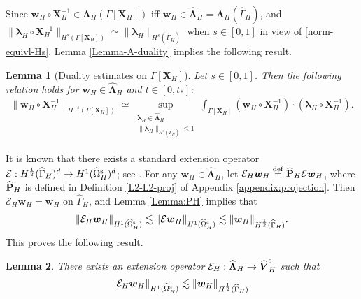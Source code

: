 \documentclass[11pt,reqno]{amsart}
\theoremstyle{definition}
\theoremstyle{plain}
\newtheorem{lemma}{Lemma}[section]
\numberwithin{theorem}{section}
\numberwithin{proposition}{section}
\numberwithin{lemma}{section}
\numberwithin{equation}{section}
\newcommand{\bs}[1]{\boldsymbol{#1}}
\renewcommand{\(}{\bigl(}
\renewcommand{\)}{\bigr)}
\def\eqd{\stackrel{\mathrm{def}}{=}}
\begin{document}
Since ${\bs w}_H\circ{\bs X}_H^{-1}\in {\bs\Lambda}_H(\Gamma[{\bs X}_H])$ iff ${\bs w}_H\in \widehat{\bs\Lambda}_H = {\bs\Lambda}_H(\widehat\Gamma_H)$, and $\|{\bs\lambda}_H\circ{\bs X}_H^{-1}\|_{H^s(\Gamma[{\bs X}_H])} \simeq \|{\bs\lambda}_H\|_{H^s(\widehat\Gamma_H )}$ when $s\in[0,1]$ in view of \eqref{norm-equivl-Hs}, Lemma \ref{Lemma-A-duality} implies the following result. 

\begin{lemma}[Duality estimates on {$\Gamma[{\bs X}_H]$}]\label{Lemma-A-duality0}
Let $s\in[0,1]$. Then the following relation holds for ${\bs w}_H\in \widehat{\bs\Lambda}_H $ and $t\in[0,t_*]$: 
\begin{align*}
\|{\bs w}_H\circ{\bs X}_H^{-1}\|_{H^{-s}(\Gamma[{\bs X}_H])}
\simeq
\sup_{\substack{{\bs\lambda}_H\in \widehat{\bs\Lambda}_H\\ \|{\bs\lambda}_H\|_{H^{s}(\widehat\Gamma_H)}\le 1}} \int_{\Gamma[{\bs X}_H]} ({\bs w}_H\circ{\bs X}_H^{-1}) \cdot ({\bs\lambda}_H\circ{\bs X}_H^{-1} ) .
\end{align*}
\end{lemma}

It is known that there exists a standard extension operator $\mathcal{E}:H^{\frac12}(\widehat\Gamma_H)^d\rightarrow H^1(\widehat\Omega^{\rm s}_H)^d$; see \cite[Theorem 1.5.1.3]{Grisvard-2011}. 
For any ${\bs w}_H\in \widehat{\bs\Lambda}_H$, let $\mathcal{E}_H{\bs w}_H\eqd \widehat{\bf P}_H\mathcal{E}{\bs w}_H$, where $\widehat{\bf P}_H$ is defined in Definition \ref{L2-L2-proj} of Appendix \ref{appendix:projection}. Then $\mathcal{E}_H{\bs w}_H={\bs w}_H$ on $\widehat\Gamma_H$, and Lemma \ref{Lemma:PH} implies that 
$$
\|\mathcal{E}_H{\bs w}_H\|_{H^1(\widehat\Omega^{\rm s}_H)}
\lesssim \|\mathcal{E}{\bs w}_H\|_{H^1(\widehat\Omega^{\rm s}_H)}
\lesssim \|{\bs w}_H\|_{H^{\frac12}(\widehat\Gamma_H)} . 
$$
This proves the following result.
\begin{lemma}\label{Lemma:extension}
There exists an extension operator $\mathcal{E}_H: \widehat{\bs\Lambda}_H \rightarrow \widehat{\bs V}^{\rm s}_H $ such that 
\begin{align*}
\|\mathcal{E}_H {\bs w}_H\|_{H^1(\widehat\Omega^{\rm s}_H)}
\lesssim \|{\bs w}_H\|_{H^{\frac12}(\widehat\Gamma_H)} . 
\end{align*}
\end{lemma}
\end{document}

